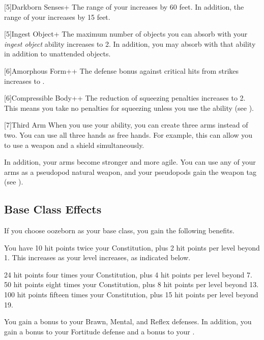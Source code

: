     [5]{Darkborn Senses+} The range of your  increases by 60 feet.
      In addition, the range of your  increases by 15 feet.

    [5]{Ingest Object+} The maximum number of objects you can absorb with your \textit{ingest object} ability increases to 2.
      In addition, you may absorb  with that ability in addition to unattended objects.

    [6]{Amorphous Form++} The defense bonus against critical hits from strikes increases to .

    [6]{Compressible Body++} The reduction of squeezing penalties increases to 2.
      This means you take no penalties for squeezing unless you use the  ability (see ).

    [7]{Third Arm} When you use your  ability, you can create three arms instead of two.
      You can use all three hands as free hands.
      For example, this can allow you to use a  weapon and a shield simultaneously.

      In addition, your arms become stronger and more agile.
      You can use any of your arms as a pseudopod natural weapon, and your pseudopods gain the  weapon tag (see ).

  \subsection{Base Class Effects}
    \veryhighhpprogressiontable

    If you choose oozeborn as your base class, you gain the following benefits.

      You have 10 hit points \add twice your Constitution, plus 2 hit points per level beyond 1.
      This increases as your level increases, as indicated below.
      \begin{raggeditemize}
         24 hit points \add four times your Constitution, plus 4 hit points per level beyond 7.
         50 hit points \add eight times your Constitution, plus 8 hit points per level beyond 13.
         100 hit points \add fifteen times your Constitution, plus 15 hit points per level beyond 19.
      \end{raggeditemize}

      You gain a  bonus to your Brawn, Mental, and Reflex defenses.
      In addition, you gain a  bonus to your Fortitude defense and a  bonus to your .

